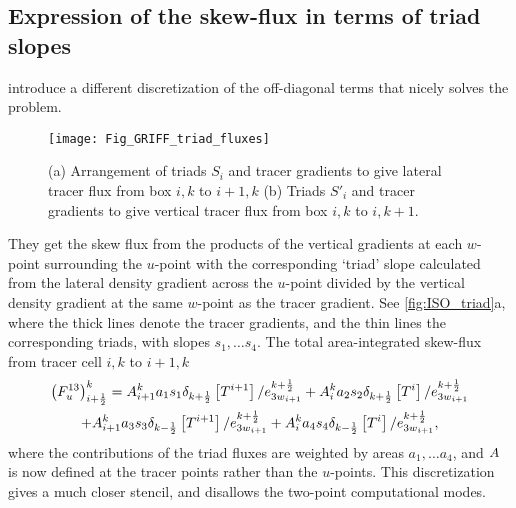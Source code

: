 \documentclass[../tex_main/NEMO_manual]{subfiles}
\begin{document}
\subsection{Expression of the skew-flux in terms of triad slopes}
\citep{Griffies_al_JPO98} introduce a different discretization of the off-diagonal terms that
nicely solves the problem.
\begin{figure}[tb] \begin{center}
    \texttt{[image: Fig\_GRIFF\_triad\_fluxes]}
    \caption{ \protect\label{fig:ISO_triad}
      (a) Arrangement of triads $S_i$ and tracer gradients to
           give lateral tracer flux from box $i,k$ to $i+1,k$
      (b) Triads $S'_i$ and tracer gradients to give vertical tracer flux from
            box $i,k$ to $i,k+1$.}
 \end{center} \end{figure}
They get the skew flux from the products of the vertical gradients at each $w$-point surrounding the $u$-point with
the corresponding `triad' slope calculated from the lateral density gradient across the $u$-point divided by
the vertical density gradient at the same $w$-point as the tracer gradient.
See \autoref{fig:ISO_triad}a, where the thick lines denote the tracer gradients,
and the thin lines the corresponding triads, with slopes $s_1, \dotsc s_4$.
The total area-integrated skew-flux from tracer cell $i,k$ to $i+1,k$
\begin{multline}
  \label{eq:i13}
  \left( F_u^{13}  \right)_{i+\frac{1}{2}}^k = {A}_{i+1}^k a_1 s_1
  \delta _{k+\frac{1}{2}} \left[ T^{i+1}
  \right]/e_{{3w}_{i+1}}^{k+\frac{1}{2}}  + {A} _i^k a_2 s_2 \delta
  _{k+\frac{1}{2}} \left[ T^i
  \right]/e_{{3w}_{i+1}}^{k+\frac{1}{2}} \\
   +{A} _{i+1}^k a_3 s_3 \delta _{k-\frac{1}{2}} \left[ T^{i+1}
  \right]/e_{{3w}_{i+1}}^{k+\frac{1}{2}}  +{A} _i^k a_4 s_4 \delta
  _{k-\frac{1}{2}} \left[ T^i \right]/e_{{3w}_{i+1}}^{k+\frac{1}{2}},
\end{multline}
where the contributions of the triad fluxes are weighted by areas $a_1, \dotsc a_4$,
and ${A}$ is now defined at the tracer points rather than the $u$-points.
This discretization gives a much closer stencil, and disallows the two-point computational modes.
\end{document}
